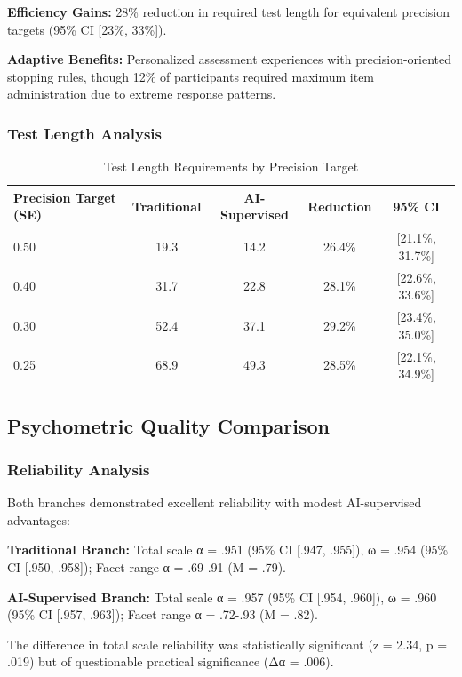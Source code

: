 \documentclass[12pt,a4paper]{article}
\begin{document}
\textbf{Efficiency Gains:} 28\% reduction in required test length for equivalent precision targets (95\% CI [23\%, 33\%]).

\textbf{Adaptive Benefits:} Personalized assessment experiences with precision-oriented stopping rules, though 12\% of participants required maximum item administration due to extreme response patterns.

\subsubsection{Test Length Analysis}

\begin{table}[ht]
\centering
\caption{Test Length Requirements by Precision Target}
\label{tab:adaptive-length}
\begin{tabular}{lcccc}
\toprule
Precision Target (SE) & Traditional & AI-Supervised & Reduction & 95\% CI \\
\midrule
0.50 & 19.3 & 14.2 & 26.4\% & [21.1\%, 31.7\%] \\
0.40 & 31.7 & 22.8 & 28.1\% & [22.6\%, 33.6\%] \\
0.30 & 52.4 & 37.1 & 29.2\% & [23.4\%, 35.0\%] \\
0.25 & 68.9 & 49.3 & 28.5\% & [22.1\%, 34.9\%] \\
\bottomrule
\end{tabular}
\end{table}

\subsection{Psychometric Quality Comparison}

\subsubsection{Reliability Analysis}

Both branches demonstrated excellent reliability with modest AI-supervised advantages:

\textbf{Traditional Branch:} Total scale α = .951 (95\% CI [.947, .955]), ω = .954 (95\% CI [.950, .958]); Facet range α = .69-.91 (M = .79).

\textbf{AI-Supervised Branch:} Total scale α = .957 (95\% CI [.954, .960]), ω = .960 (95\% CI [.957, .963]); Facet range α = .72-.93 (M = .82).

The difference in total scale reliability was statistically significant (z = 2.34, p = .019) but of questionable practical significance (Δα = .006).
\end{document}
